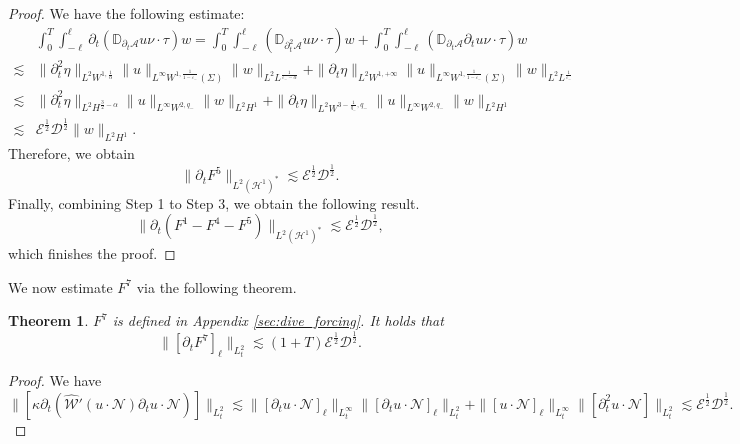 \documentclass[letterpaper,reqno,10pt,twoside]{amsart}
\newtheorem{theorem}{Theorem}[section]
\theoremstyle{definition}
\theoremstyle{remark}
\def\p{\partial}
\begin{document}
\begin{proof}
			We have the following estimate:
			\[
			\begin{aligned}
				&\int_{0}^{T}\int_{-\ell}^{\ell} \p_{t}(\mathbb{D}_{\p_{t}\mathcal{A}}u\nu\cdot \tau)w
				=\int_{0}^{T}\int_{-\ell}^{\ell} (\mathbb{D}_{\p_{t}^{2}\mathcal{A}}u\nu\cdot \tau)w+\int_{0}^{T}\int_{-\ell}^{\ell} (\mathbb{D}_{\p_{t}\mathcal{A}}\p_{t}u\nu\cdot \tau)w\\
				\lesssim &\|\p_{t}^{2}\eta\|_{L^{2}W^{1,\frac{1}{\alpha}}}\|u\|_{L^{\infty}W^{1,\frac{1}{1-\varepsilon_{-}}}(\Sigma)}\|w\|_{L^{2}L^{\frac{1}{\varepsilon_{-}-\alpha}}}+\|\p_{t}\eta\|_{L^{2}W^{1,+\infty}}\|u\|_{L^{\infty}W^{1,\frac{1}{1-\varepsilon_{-}}}(\Sigma)}\|w \|_{L^{2}L^{\frac{1}{\varepsilon_{-}}}}\\
				\lesssim& \|\p_{t}^{2}\eta\|_{L^{2}H^{\frac{3}{2}-\alpha}}\|u\|_{L^{\infty}W^{2,q_{-}}}\|w \|_{L^{2}H^{1}}+\|\p_{t}\eta\|_{L^{2}W^{3-\frac{1}{q_{-}},q_{-}}}\|u\|_{L^{\infty}W^{2,q_{-}}}\|w\|_{L^{2}H^{1}}\\
				\lesssim& \mathscr{E}^{\frac{1}{2}}\mathscr{D}^{\frac{1}{2}}\|w\|_{L^{2}H^{1}}.
			\end{aligned}
			\]
			Therefore, we obtain
			\[
			\|\p_{t}F^{5}\|_{L^{2}(\mathcal{H}^1)^{*}}\lesssim \mathscr{E}^{\frac{1}{2}}\mathscr{D}^{\frac{1}{2}}.
			\]
			Finally, combining Step 1 to Step 3, we obtain the following result.
			\[
			\|\p_{t}(F^{1}-F^{4}-F^{5})\|_{L^{2}(\mathcal{H}^1)^{*}}\lesssim\mathscr{E}^{\frac{1}{2}}\mathscr{D}^{\frac{1}{2}},
			\]
			\noindent which finishes the proof.
		\end{proof}
		
		We now estimate $F^{7}$ via the following theorem.
		\begin{theorem}{\label{prop:force_contact}}
			$F^{7}$ is defined in Appendix \ref{sec:dive_forcing}. It holds that
			\[
			\|[\p_{t}F^{7}]_{\ell}\|_{L_{t}^{2}}\lesssim(1+T) \mathscr{E}^{\frac{1}{2}}\mathscr{D}^{\frac{1}{2}}.
			\]
		\end{theorem}
		
		\begin{proof}
			We have
			\[
			\|[\kappa\p_{t}(\hat{\mathscr{W}}'(u\cdot \mathcal{N})\p_{t}u\cdot \mathcal{N})]\|_{L_{t}^{2}}\lesssim \|[\p_{t}u\cdot \mathcal{N}]_{\ell}\|_{L_{t}^{\infty}}\|[\p_{t}u\cdot \mathcal{N}]_{\ell}\|_{L_{t}^{2}}+\|[u\cdot \mathcal{N}]_{\ell}\|_{L_{t}^{\infty}}\|[\p_{t}^{2}u\cdot \mathcal{N}]\|_{L_{t}^{2}}\lesssim \mathscr{E}^{\frac{1}{2}}\mathscr{D}^{\frac{1}{2}}.
			\]
		\end{proof}
		
\end{document}
